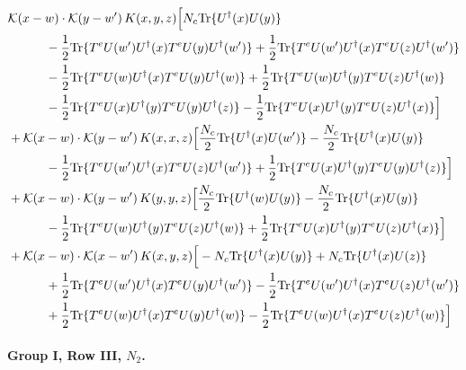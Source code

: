 \documentclass[10pt]{article}
\numberwithin{equation}{section}
\begin{document}
\begin{align}
&\mathcal K(x-w)\cdot\mathcal K(y-w')\,K(x,y,z)\Big[N_c{\rm Tr}\{U^\dagger(x)U(y)\}\notag\\
&\quad\quad\quad-\frac{1}{2}{\rm Tr}\{T^eU(w')U^\dagger(x)T^eU(y)U^\dagger(w')\}+\frac{1}{2}{\rm Tr}\{T^eU(w')U^\dagger(x)T^eU(z)U^\dagger(w')\}\notag\\
&\quad\quad\quad-\frac{1}{2}{\rm Tr}\{T^eU(w)U^\dagger(x)T^eU(y)U^\dagger(w)\}+\frac{1}{2}{\rm Tr}\{T^eU(w)U^\dagger(y)T^eU(z)U^\dagger(w)\}\notag\\
&\quad\quad\quad-\frac{1}{2}{\rm Tr}\{T^eU(x)U^\dagger(y)T^eU(y)U^\dagger(z)\}-\frac{1}{2}{\rm Tr}\{T^eU(x)U^\dagger(y)T^eU(z)U^\dagger(x)\}\Big]\notag\\
&+\mathcal K(x-w)\cdot\mathcal K(y-w')\,K(x,x,z)\Big[\frac{N_c}{2}{\rm Tr}\{U^\dagger(x)U(w')\}-\frac{N_c}{2}{\rm Tr}\{U^\dagger(x)U(y)\}\notag\\
&\quad\quad\quad-\frac{1}{2}{\rm Tr}\{T^eU(w')U^\dagger(x)T^eU(z)U^\dagger(w')\}+\frac{1}{2}{\rm Tr}\{T^eU(x)U^\dagger(y)T^eU(y)U^\dagger(z)\}\Big]\notag\\
&+\mathcal K(x-w)\cdot\mathcal K(y-w')\,K(y,y,z)\Big[\frac{N_c}{2}{\rm Tr}\{U^\dagger(w)U(y)\}-\frac{N_c}{2}{\rm Tr}\{U^\dagger(x)U(y)\}\notag\\
&\quad\quad\quad-\frac{1}{2}{\rm Tr}\{T^eU(w)U^\dagger(y)T^eU(z)U^\dagger(w)\}+\frac{1}{2}{\rm Tr}\{T^eU(x)U^\dagger(y)T^eU(z)U^\dagger(x)\}\Big]\notag\\
&+\mathcal K(x-w)\cdot\mathcal K(x-w')\,K(x,y,z)\Big[-N_c{\rm Tr}\{U^\dagger(x)U(y)\}+N_c{\rm Tr}\{U^\dagger(x)U(z)\}\notag\\
&\quad\quad\quad+\frac{1}{2}{\rm Tr}\{T^eU(w')U^\dagger(x)T^eU(y)U^\dagger(w')\}-\frac{1}{2}{\rm Tr}\{T^eU(w')U^\dagger(x)T^eU(z)U^\dagger(w')\}\notag\\
&\quad\quad\quad+\frac{1}{2}{\rm Tr}\{T^eU(w)U^\dagger(x)T^eU(y)U^\dagger(w)\}-\frac{1}{2}{\rm Tr}\{T^eU(w)U^\dagger(x)T^eU(z)U^\dagger(w)\}\Big]
\label{eq:list8}
\end{align}

\paragraph{Group I, Row III, $N_2$.}
\end{document}
